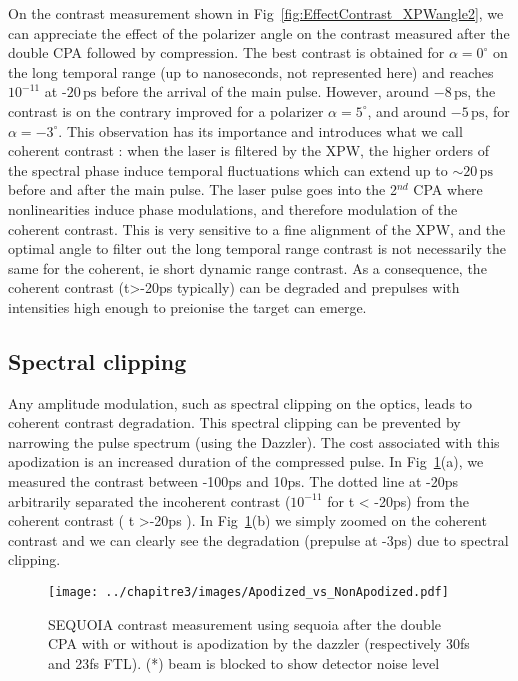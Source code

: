  \noindent On the contrast measurement shown in Fig~\ref{fig:EffectContrast_XPWangle2}, we can appreciate the effect of the polarizer angle on the contrast measured after the double CPA followed by compression. The best contrast is obtained for $\alpha = 0^{\circ}$ on the long temporal range (up to nanoseconds, not represented here) and reaches $10^{-11}$ at -$20\,\mathrm{ps}$ before the arrival of the main pulse. However, around $-8\,\mathrm{ps}$, the contrast is on the contrary improved for a polarizer $\alpha = 5^{\circ}$, and around $-5\,\mathrm{ps}$, for $\alpha = -3^{\circ}$. This observation has its importance and introduces what we call coherent contrast : when the laser is filtered by the XPW, the higher orders of the spectral phase induce temporal fluctuations which can extend up to $\sim 20\,\mathrm{ps}$ before and after the main pulse. The laser pulse goes into the 2$^{nd}$ CPA where nonlinearities induce phase modulations, and therefore modulation of the coherent contrast. This is very sensitive to a fine alignment of the XPW, and the optimal angle to filter out the long temporal range contrast is not necessarily the same for the coherent, ie short dynamic range contrast. As a consequence, the coherent contrast (t>-20ps typically) can be degraded and prepulses with intensities high enough to preionise the target can emerge. 

\subsection{Spectral clipping}
\label{subsection:Spectral clipping}

Any amplitude modulation, such as spectral clipping on the optics, leads to coherent contrast degradation. This spectral clipping can be prevented by narrowing  the pulse spectrum (using the Dazzler). The cost associated with this apodization is an increased duration of the compressed pulse. 
In Fig~\ref{fig:EffectContrast_XPWangle}(a), we measured the contrast between -100ps and 10ps. The dotted line at -20ps arbitrarily separated the incoherent contrast ($10^{-11}$ for t < -20ps) from the coherent contrast ( t >-20ps ). In Fig~\ref{fig:EffectContrast_XPWangle}(b) we simply zoomed on the coherent contrast and we can clearly see the degradation (prepulse at -3ps) due to spectral clipping.



\begin{figure}[H]
\centering
\texttt{[image: ../chapitre3/images/Apodized\_vs\_NonApodized.pdf]}\\
\caption{\label{fig:EffectContrast_XPWangle} SEQUOIA contrast measurement using sequoia after the double CPA with or without is apodization by the dazzler (respectively 30fs and 23fs FTL). (*) beam is blocked to show detector noise level}
\end{figure}

